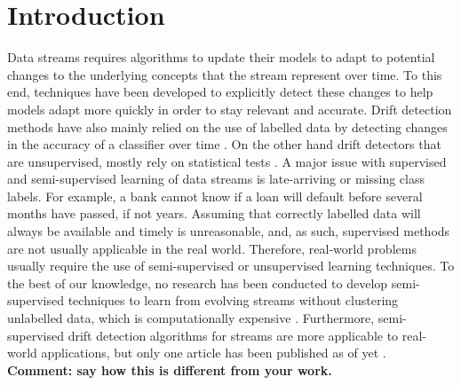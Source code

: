 \documentclass[runningheads]{llncs}
\begin{document}
\section{Introduction}

Data streams requires algorithms to update their models to adapt to potential changes to the underlying concepts that the stream represent over time. To this end, techniques have been developed to explicitly detect these changes to help models adapt more quickly in order to stay relevant and accurate. Drift detection methods have also mainly relied on the use of labelled data by detecting changes in the accuracy of a classifier over time \cite{bifet2007learning, gama2004learning}. On the other hand drift detectors that are unsupervised, mostly rely on statistical tests \cite{sobolewski2013concept}. A major issue with supervised and semi-supervised learning of data streams is late-arriving or missing class labels. For example, a bank cannot know if a loan will default before several months have passed, if not years. Assuming that correctly labelled data will always be available and timely is unreasonable, and, as such, supervised methods are not usually applicable in the real world. Therefore, real-world problems usually require the use of semi-supervised or unsupervised learning techniques. To the best of our knowledge, no research has been conducted to develop semi-supervised techniques to learn from evolving streams without clustering unlabelled data, which is computationally expensive \cite{krempl2014open}. Furthermore, semi-supervised drift detection algorithms for streams are more applicable to real-world applications, but only one article has been published as of yet \cite{haque2015sand}. {\bf {Comment: say how this is different from your work.}}
\end{document}
